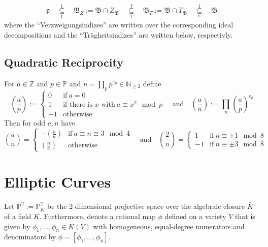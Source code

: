 \documentclass{scrartcl}
\newcommand{\N}{\mathbb{N}}
\newcommand{\Z}{\mathbb{Z}}
\begin{document}
\begin{align*}
    \mathfrak{p} \quad \underset{1}{\overset{1}{\subseteq}} \quad \mathfrak{B}_Z := \mathfrak{B} \cap Z_\mathfrak{B} \quad \underset{1}{\overset{f}{\subseteq}} \quad \mathfrak{B}_T := \mathfrak{B} \cap T_\mathfrak{B} \quad \underset{e}{\overset{1}{\subseteq}} \quad \mathfrak{B}
\end{align*}
where the ``Verzweigungsindizes'' are written over the corresponding ideal decompositions and the ``Trägheitsindizes'' are written below, respectivly.

\subsection{Quadratic Reciprocity}
For $a \in \Z$ and $p \in \mathbb{P}$ and $n = \prod_{p} p^{e_p} \in \N_{\geq 2}$ define
\begin{equation*}
    \left(\frac a p \right) := \begin{cases}
        0 & \text{if} \ a = 0 \\
        1 & \text{if there is $x$ with} \ a \equiv x^2 \mod p \\
        -1 & \text{otherwise}
    \end{cases} \quad \text{and} \quad
    \left(\frac a n \right) := \prod_p \left( \frac a p \right)^{e_p}
\end{equation*}
Then for odd $a, n$ have
\begin{equation*}
    \left(\frac a n\right) = \begin{cases}
        -\left(\frac n a \right) & \text{if} \ a \equiv n \equiv 3 \mod 4 \\
        \left(\frac n a \right) & \text{otherwise}
    \end{cases} \quad \text{and} \quad
    \left(\frac 2 n\right) = \begin{cases}
        1 & \text{if} \ n \equiv \pm 1 \mod 8 \\
        -1 & \text{if} \ n \equiv \pm 3 \mod 8
    \end{cases}
\end{equation*}

\section{Elliptic Curves}

Let $\mathbb{P}^2 := \mathbb{P}^2_{\bar{K}}$ be the 2 dimensional projective space over the algebraic closure $\bar{K}$ of a field $K$.
Furthermore, denote a rational map $\phi$ defined on a variety $V$ that is given by $\phi_1, ..., \phi_n \in K(V)$ with homogeneous, equal-degree numerators and denominators by $\phi = [\phi_1, ..., \phi_n]$.
\end{document}
